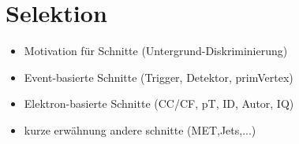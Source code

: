 \section{Selektion}
\label{data_sim_selection:selection}

\begin{itemize}
    \item Motivation für Schnitte (Untergrund-Diskriminierung)
    \item Event-basierte Schnitte (Trigger, Detektor, primVertex)
    \item Elektron-basierte Schnitte (CC/CF, pT, ID, Autor, IQ)
    \item kurze erwähnung andere schnitte (MET,Jets,...)
\end{itemize}


